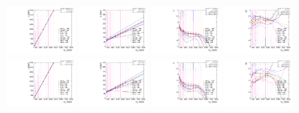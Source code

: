 \begin{figure}[htbp]
  \includegraphics[width=0.2\textwidth]{fig/2Dfit/paramSignalShape_allSig_MVV_HP_nobb_LDy_MEAN.pdf}
  \includegraphics[width=0.2\textwidth]{fig/2Dfit/paramSignalShape_allSig_MVV_HP_nobb_LDy_SIGMA.pdf}
  \includegraphics[width=0.2\textwidth]{fig/2Dfit/paramSignalShape_allSig_MVV_HP_nobb_LDy_ALPHA1.pdf}
  \includegraphics[width=0.2\textwidth]{fig/2Dfit/paramSignalShape_allSig_MVV_HP_nobb_LDy_ALPHA2.pdf}\\
  \includegraphics[width=0.2\textwidth]{fig/2Dfit/paramSignalShape_allSig_MVV_LP_nobb_LDy_MEAN.pdf}
  \includegraphics[width=0.2\textwidth]{fig/2Dfit/paramSignalShape_allSig_MVV_LP_nobb_LDy_SIGMA.pdf}
  \includegraphics[width=0.2\textwidth]{fig/2Dfit/paramSignalShape_allSig_MVV_LP_nobb_LDy_ALPHA1.pdf}
  \includegraphics[width=0.2\textwidth]{fig/2Dfit/paramSignalShape_allSig_MVV_LP_nobb_LDy_ALPHA2.pdf}\\

\end{figure}
